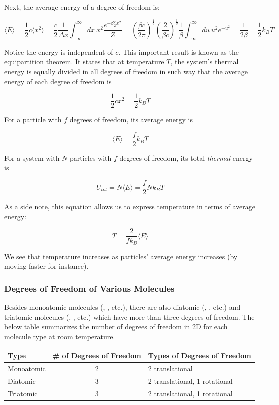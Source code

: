 \documentclass[12pt, a4paper]{article}
\begin{document}
Next, the average energy of a degree of freedom is:

$$\langle E \rangle=\frac12c\langle x^2 \rangle=\frac{c}{2}\frac{1}{\Delta x}\int_{-\infty}^\infty dx \: x^2 \frac{e^{-\beta\frac{c}{2}x^2}}{Z}=\left(\frac{\beta c}{2\pi}\right)^\frac12\left(\frac{2}{\beta c}\right)^\frac12 \frac{1}{\beta} \int_{-\infty}^\infty du \: u^2 e^{-u^2}=\frac{1}{2\beta}=\frac12k_BT$$

Notice the energy is independent of $c$. This important result is known as the equipartition theorem. It states that at temperature $T$, the system's thermal energy is equally divided in all degrees of freedom in such way that the average energy of each degree of freedom is

$$\frac12cx^2=\frac12k_BT$$

For a particle with $f$ degrees of freedom, its average energy is

$$\langle E \rangle=\frac{f}{2}k_BT$$

For a system with $N$ particles with $f$ degrees of freedom, its total \textit{thermal} energy is

$$U_{tot}=N\langle E \rangle=\frac{f}{2}Nk_BT$$

As a side note, this equation allows us to express temperature in terms of average energy:

$$T=\frac{2}{fk_B}\langle E \rangle$$

We see that temperature increases as particles' average energy increases (by moving faster for instance).

\subsubsection{Degrees of Freedom of Various Molecules}

Besides monoatomic molecules (, , etc.), there are also diatomic (, , etc.) and triatomic molecules (, , etc.) which have more than three degrees of freedom. The below table summarizes the number of degrees of freedom in 2D for each molecule type at room temperature.

\begin{center}
\begin{tabular}{|l|c|l|}
    \hline
    Type & \# of Degrees of Freedom & Types of Degrees of Freedom \\
    \hline
    Monoatomic & 2 & 2 translational \\
    \hline
    Diatomic & 3 & 2 translational, 1 rotational \\
    \hline
    Triatomic & 3 & 2 translational, 1 rotational \\
    \hline
\end{tabular}
\end{center}
\end{document}
